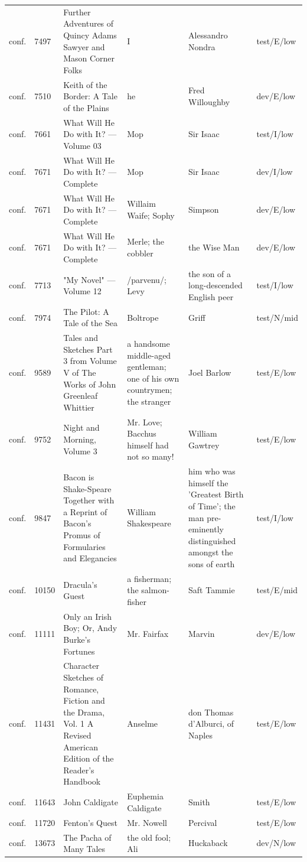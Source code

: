 \documentclass[11pt]{article}
\begin{document}
{\begin{longtable}{p{0.9cm}p{0.9cm}p{4.0cm}p{3.3cm}p{3.0cm}p{1.8cm}}
conf. & 7497 & Further Adventures of Quincy Adams Sawyer and Mason Corner Folks & I & Alessandro Nondra & test/E/low \\
conf. & 7510 & Keith of the Border: A Tale of the Plains & he & Fred Willoughby & dev/E/low \\
conf. & 7661 & What Will He Do with It? — Volume 03 & Mop & Sir Isaac & test/I/low \\
conf. & 7671 & What Will He Do with It? — Complete & Mop & Sir Isaac & dev/I/low \\
conf. & 7671 & What Will He Do with It? — Complete & Willaim Waife; Sophy & Simpson & dev/E/low \\
conf. & 7671 & What Will He Do with It? — Complete & Merle; the cobbler & the Wise Man & dev/E/low \\
conf. & 7713 & "My Novel" — Volume 12 & /parvenu/; Levy & the son of a long-descended English peer & test/I/low \\
conf. & 7974 & The Pilot: A Tale of the Sea & Boltrope & Griff & test/N/mid \\
conf. & 9589 & Tales and Sketches Part 3 from Volume V of The Works of John Greenleaf Whittier & a handsome middle-aged gentleman; one of his own countrymen; the stranger & Joel Barlow & test/E/low \\
conf. & 9752 & Night and Morning, Volume 3 & Mr. Love; Bacchus himself had not so many! & William Gawtrey & test/E/low \\
conf. & 9847 & Bacon is Shake-Speare Together with a Reprint of Bacon's Promus of Formularies and Elegancies & William Shakespeare & him who was himself the 'Greatest Birth of Time'; the man pre-eminently distinguished amongst the sons of earth & test/I/low \\
conf. & 10150 & Dracula's Guest & a fisherman; the salmon-fisher & Saft Tammie & test/E/mid \\
conf. & 11111 & Only an Irish Boy; Or, Andy Burke's Fortunes & Mr. Fairfax & Marvin & dev/E/low \\
conf. & 11431 & Character Sketches of Romance, Fiction and the Drama, Vol. 1 A Revised American Edition of the Reader's Handbook & Anselme & don Thomas d'Alburci, of Naples & test/E/low \\
conf. & 11643 & John Caldigate & Euphemia Caldigate & Smith & test/E/low \\
conf. & 11720 & Fenton's Quest & Mr. Nowell & Percival & test/E/low \\
conf. & 13673 & The Pacha of Many Tales & the old fool; Ali & Huckaback & dev/N/low \\

\end{longtable}}
\end{document}
